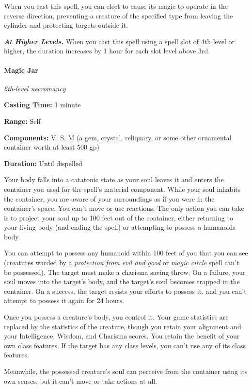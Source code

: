 \documentclass[
]{article}
\begin{document}
When you cast this spell, you can elect to cause its magic to operate in
the reverse direction, preventing a creature of the specified type from
leaving the cylinder and protecting targets outside it.

\emph{\textbf{At Higher Levels.}} When you cast this spell using a spell
slot of 4th level or higher, the duration increases by 1 hour for each
slot level above 3rd.

\hypertarget{magic-jar}{%
\paragraph{Magic Jar}\label{magic-jar}}

\emph{6th-level necromancy}

\textbf{Casting Time:} 1 minute

\textbf{Range:} Self

\textbf{Components:} V, S, M (a gem, crystal, reliquary, or some other
ornamental container worth at least 500 gp)

\textbf{Duration:} Until dispelled

Your body falls into a catatonic state as your soul leaves it and enters
the container you used for the spell's material component. While your
soul inhabits the container, you are aware of your surroundings as if
you were in the container's space. You can't move or use reactions. The
only action you can take is to project your soul up to 100 feet out of
the container, either returning to your living body (and ending the
spell) or attempting to possess a humanoids body.

You can attempt to possess any humanoid within 100 feet of you that you
can see (creatures warded by a \emph{protection from evil and good} or
\emph{magic circle} spell can't be possessed). The target must make a
charisma saving throw. On a failure, your soul moves into the target's
body, and the target's soul becomes trapped in the container. On a
success, the target resists your efforts to possess it, and you can't
attempt to possess it again for 24 hours.

Once you possess a creature's body, you control it. Your game statistics
are replaced by the statistics of the creature, though you retain your
alignment and your Intelligence, Wisdom, and Charisma scores. You retain
the benefit of your own class features. If the target has any class
levels, you can't use any of its class features.

Meanwhile, the possessed creature's soul can perceive from the container
using its own senses, but it can't move or take actions at all.
\end{document}
